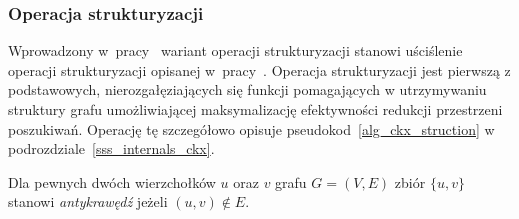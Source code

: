 \subsubsection{\textbf{Operacja strukturyzacji}}\label{sss_ckx_struction}
\par{
  Wprowadzony w~pracy~\cite{ImprovedBounds10} wariant operacji strukturyzacji stanowi uściślenie operacji strukturyzacji opisanej w~pracy~\cite{Ebengger:1984}.
  Operacja strukturyzacji jest pierwszą z podstawowych, nierozgałęziających się funkcji pomagających w utrzymywaniu struktury grafu umożliwiającej maksymalizację efektywności redukcji przestrzeni poszukiwań.
  Operację tę szczegółowo opisuje pseudokod~\ref{alg_ckx_struction} w podrozdziale~\ref{sss_internals_ckx}.
}
\par{
  \begin{definition}
    Dla pewnych dwóch wierzchołków $u$ oraz $v$ grafu $G=(V, E)$ zbiór $\{u, v\}$ stanowi \emph{antykrawędź} jeżeli $(u, v) \notin E$.
  \end{definition}

}

